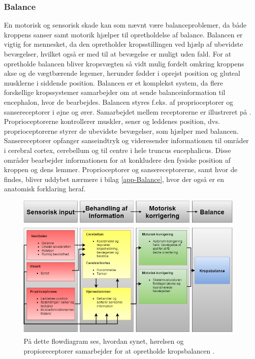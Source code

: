 \subsubsection{Balance}
En motorisk og sensorisk skade kan som nævnt være balanceproblemer, da både kroppens sanser samt motorik hjælper til opretholdelse af balance. Balancen er vigtig for mennesket, da den opretholder kropsstillingen ved hjælp af ubevidste bevægelser, hvilket også er med til at bevægelse er muligt uden fald. For at opretholde balancen bliver kropsvægten så vidt mulig fordelt omkring kroppens akse og de vægtbærende legemer, herunder fødder i oprejst position og gluteal musklerne i siddende position.\cite{Nichols1997}
Balancen er et komplekst system, da flere forskellige kropssystemer samarbejder om at sende balanceinformation til encephalon, hvor de bearbejdes. Balancen styres f.eks. af proprioceptorer og sansereceptorer i øjne og ører. Samarbejdet mellem receptorerne er illustreret på . Proprioceptorerne kontrollerer muskler, sener og leddenes position, dvs. proprioceptorerne styrer de ubevidste bevægelser, som hjælper med balancen. \cite{Martini2012} Sansereceptorer opfanger sanseindtryk og videresender informationen til områder i cerebral cortex, cerebellum og til centre i hele truncus encephalicus. Disse områder bearbejder informationen for at konkludere den fysiske position af kroppen og dens lemmer. \cite{Martini2012,Karnath2003} Proprioceptorer og sansereceptorerne, samt hvor de findes, bliver uddybet nærmere i bilag \ref{app-Balance}, hvor der også er en anatomisk forklaring heraf.

\begin{figure}[H]
	\centering
	\includegraphics[scale=0.48]{figures/bProblemanalyse/Balance-Flowdiagram.png}
	\caption{På dette flowdiagram ses, hvordan synet, hørelsen og propioreceptorer samarbejder for at opretholde kropsbalancen \cite{watson2015}.}
	\label{flowbalance}
\end{figure}

